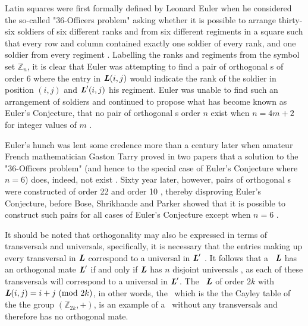Latin squares were first formally defined by Leonard Euler when he considered the so-called "36-Officers problem" asking whether it is possible to arrange thirty-six soldiers of six different ranks and from six different regiments in a square such that every row and column contained exactly one soldier of every rank, and one soldier from every regiment \cite{euler}. Labelling the ranks and regiments from the symbol set $\mathbb{Z}_n$, it is clear that Euler was attempting to find a pair of orthogonal \lat s of order 6 where the entry in $\mbox{\bf \emph{L}}(i,j)$ would indicate the rank of the soldier in position $(i,j)$ and $\mbox{\bf \emph{L}}'(i,j)$ his regiment.  Euler was unable to find such an arrangement of soldiers and continued to propose what has become known as Euler's Conjecture, that no pair of orthogonal \lat s order $n$ exist when $n=4m+2$ for integer values of $m$ \cite{euler}.

 Euler's hunch was lent some credence more than a century later when amateur French mathematician Gaston Tarry proved in two papers that a solution to the "36-Officers problem" (and hence to the special case of Euler's Conjecture where $n=6$) does, indeed,  not exist \cite{tarry}. Sixty year later, however, pairs of orthogonal \lat s were constructed of order 22 \cite{bose1} and order 10 \cite{parker1959construction}, thereby disproving Euler's Conjecture, before Bose, Shrikhande and Parker showed  that it is possible to construct such pairs for all cases of Euler's Conjecture except when $n=6$ \cite{bose}.

It should be noted that orthogonality may also be expressed in terms of transversals and universals, specifically, it is necessary that the entries making up every transversal in $\mbox{\bf \emph{L}}$ correspond to a universal in $\mbox{\bf \emph{L}}'$ \cite[p. 183]{wallis}. It follows that a \lat \ $\mbox{\bf \emph{L}}$ has an  orthogonal mate $\mbox{\bf \emph{L}}'$ if and only if $\mbox{\bf \emph{L}}$ has $n$ disjoint universals \cite[Theorem 5.1.1]{Denes1}, as each of these transversals will correspond to a universal in $\mbox{\bf \emph{L}}'$. The \lat \ $\mbox{\bf \emph{L}}$ of order $2k$ with $\mbox{\bf \emph{L}}(i,j) = i+j \mbox{ (mod $2k$)}$, in other words, the \lat  \ which is the the Cayley table of the the group $(\mathbb{Z}_{2k}, +)$, is an example of a \lat \ without any transversals and therefore has no orthogonal mate.

